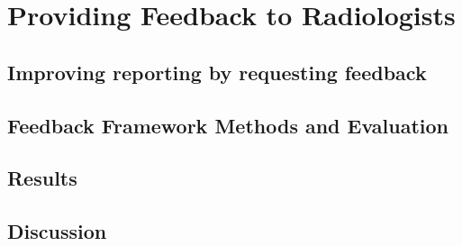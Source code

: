 \chapter{Providing Feedback to Radiologists}

\clearpage

\section{Improving reporting by requesting feedback}

\clearpage

\section{Feedback Framework Methods and Evaluation}

\clearpage

\section{Results}

\clearpage

\section{Discussion}
